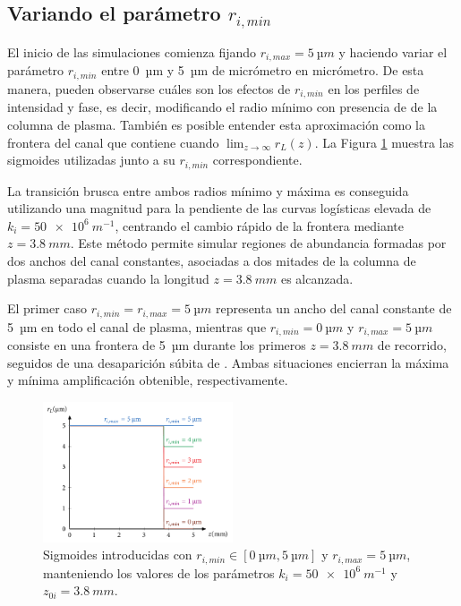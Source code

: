 \subsection{Variando el parámetro $r_{i,min}$}\label{sec:4.1.1}
El inicio de las simulaciones comienza fijando $r_{i,max}=\qty{5}{µm}$ y haciendo variar el parámetro $r_{i,min}$ entre \qty{0}{µm} y \qty{5}{µm} de micrómetro en micrómetro. De esta manera, pueden observarse cuáles son los efectos de $r_{i,min}$ en los perfiles de intensidad y fase, es decir, modificando el radio mínimo con presencia de  de la columna de plasma. También es posible entender esta aproximación como la frontera del canal que contiene  cuando $\lim_{z \to \infty}r_{L}(z)$. La Figura \ref{fig:4.5} muestra las sigmoides utilizadas junto a su $r_{i,min}$ correspondiente.

La transición brusca entre ambos radios mínimo y máxima es conseguida utilizando una magnitud para la pendiente de las curvas logísticas elevada de $k_{i}=\qty{50e6}{m^{-1}}$, centrando el cambio rápido de la frontera mediante $z=\qty{3.8}{mm}$. Este método permite simular regiones de abundancia formadas por dos anchos del canal constantes, asociadas a dos mitades de la columna de plasma separadas cuando la longitud $z=\qty{3.8}{mm}$ es alcanzada. 

El primer caso $r_{i,min}=r_{i,max}=\qty{5}{µm}$ representa un ancho del canal constante de \qty{5}{µm} en todo el canal de plasma, mientras que $r_{i,min}=\qty{0}{µm}$ y $r_{i,max}=\qty{5}{µm}$ consiste en una frontera de \qty{5}{µm} durante los primeros $z=\qty{3.8}{mm}$ de recorrido, seguidos de una desaparición súbita de . Ambas situaciones encierran la máxima y mínima amplificación obtenible, respectivamente.

\begin{figure}[htbp]
  \centering
  \includegraphics[width=0.5\textwidth]{Figuras/ch4_sigm_rmin.pdf}
  \caption{Sigmoides introducidas con $r_{i,min}\in[\qty{0}{µm},\qty{5}{µm}]$ y $r_{i,max}=\qty{5}{µm}$, manteniendo los valores de los parámetros $k_{i}=\qty{50e6}{m^{-1}}$ y $z_{0i}=\qty{3.8}{mm}$.}
  \label{fig:4.5}
\end{figure}

